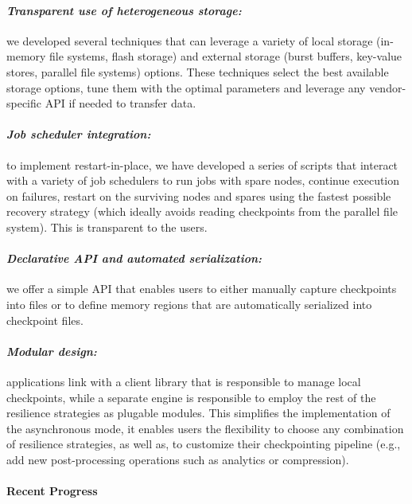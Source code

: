 \paragraph{\emph{Transparent use of heterogeneous storage:}} we
developed several techniques that can leverage a variety of local
storage (in-memory file systems, flash storage) and external storage
(burst buffers, key-value stores, parallel file systems)
options. These techniques select the best available storage options,
tune them with the optimal parameters and leverage any vendor-specific
API if needed to transfer data.
\vspace{-1em}

\paragraph{\emph{Job scheduler integration:}} to implement
restart-in-place, we have developed a series of scripts that interact
with a variety of job schedulers to run jobs with spare nodes,
continue execution on failures, restart on the surviving nodes and
spares using the fastest possible recovery strategy (which ideally
avoids reading checkpoints from the parallel file system). This is
transparent to the users.
\vspace{-1em}

\paragraph{\emph{Declarative API and automated serialization:}} we
offer a simple API that enables users to either manually capture
checkpoints into files or to define memory regions that are
automatically serialized into checkpoint files.
\vspace{-1em}

\paragraph{\emph{Modular design:}} applications link with a client
library that is responsible to manage local checkpoints, while a
separate engine is responsible to employ the rest of the resilience
strategies as plugable modules. This simplifies the implementation
of the asynchronous mode, it enables users the flexibility to choose any
combination of resilience strategies, as well as, to customize their
checkpointing pipeline (e.g., add new post-processing operations such
as analytics or compression).

\paragraph{Recent Progress}

